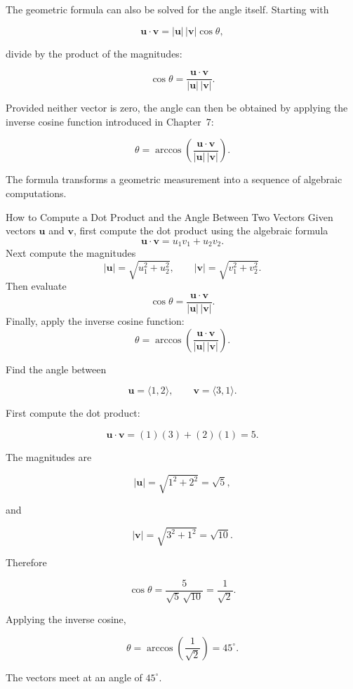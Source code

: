 The geometric formula can also be solved for the angle itself. Starting
with

\[
\mathbf{u}\cdot\mathbf{v}
=
|\mathbf{u}|\,|\mathbf{v}|\cos\theta,
\]

divide by the product of the magnitudes:

\[
\cos\theta
=
\frac{\mathbf{u}\cdot\mathbf{v}}
     {|\mathbf{u}|\,|\mathbf{v}|}.
\]

Provided neither vector is zero, the angle can then be obtained by
applying the inverse cosine function introduced in Chapter~7:

\[
\theta
=
\arccos
\left(
\frac{\mathbf{u}\cdot\mathbf{v}}
     {|\mathbf{u}|\,|\mathbf{v}|}
\right).
\]

The formula transforms a geometric measurement into a sequence of
algebraic computations.

\begin{algorithmproc}{How to Compute a Dot Product and the Angle Between Two Vectors}
Given vectors $\mathbf{u}$ and $\mathbf{v}$, first compute the dot product
using the algebraic formula
\[
\mathbf{u}\cdot\mathbf{v}
=
u_1v_1+u_2v_2.
\]
Next compute the magnitudes
\[
|\mathbf{u}|=\sqrt{u_1^2+u_2^2},
\qquad
|\mathbf{v}|=\sqrt{v_1^2+v_2^2}.
\]
Then evaluate
\[
\cos\theta
=
\frac{\mathbf{u}\cdot\mathbf{v}}
     {|\mathbf{u}|\,|\mathbf{v}|}.
\]
Finally, apply the inverse cosine function:
\[
\theta
=
\arccos
\left(
\frac{\mathbf{u}\cdot\mathbf{v}}
     {|\mathbf{u}|\,|\mathbf{v}|}
\right).
\]
\end{algorithmproc}

\begin{example}
Find the angle between

\[
\mathbf{u}
=
\langle 1,2\rangle,
\qquad
\mathbf{v}
=
\langle 3,1\rangle.
\]

First compute the dot product:

\[
\mathbf{u}\cdot\mathbf{v}
=
(1)(3)+(2)(1)
=
5.
\]

The magnitudes are

\[
|\mathbf{u}|
=
\sqrt{1^2+2^2}
=
\sqrt5,
\]

and

\[
|\mathbf{v}|
=
\sqrt{3^2+1^2}
=
\sqrt{10}.
\]

Therefore

\[
\cos\theta
=
\frac{5}{\sqrt5\,\sqrt{10}}
=
\frac{1}{\sqrt2}.
\]

Applying the inverse cosine,

\[
\theta
=
\arccos\!\left(\frac1{\sqrt2}\right)
=
45^\circ.
\]

The vectors meet at an angle of $45^\circ$.
\end{example}

